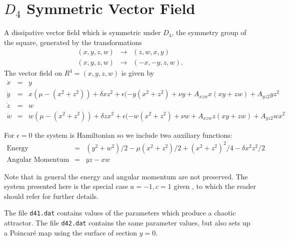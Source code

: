 \section{$D_4$ Symmetric Vector Field}

A dissipative vector field which is symmetric
under $D_4$, the symmetry group of the square, generated by
the transformations
\begin{eqnarray*}
	(x,y,z,w) &\to& (z,w,x,y) \\
	(x,y,z,w) &\to& (-x,-y,z,w).
\end{eqnarray*}
        The vector field on $R^4 = {(x,y,z,w)}$ is given by
\begin{eqnarray*}
                \dot{x} &=& y \\
                \dot{y} &=& x(\mu-(x^2 + z^2)) + \delta x z^2
                       + \epsilon( -y (x^2 + z^2) + \nu y
                       + A_{xzw} x(x y + z w) + A_{yz2} y z^2 \\
                \dot{z} &=& w \\
                \dot{w} &=& w(\mu-(x^2 + z^2)) + \delta z x^2
                       + \epsilon(-w (x^2 + z^2) + \nu w
                       + A_{xzw} z (x y + z w) + A_{yz2} w x^2
\end{eqnarray*}

For $\epsilon=0$ the system is Hamiltonian so we include two auxiliary
functions:
\begin{eqnarray*}
        \mbox{Energy} &=& (y^2 + w^2)/2 -  \mu(x^2+z^2)/2 + 
                    (x^2 + z^2)^2/4 - \delta x^2 z^2/2 \\
        \mbox{Angular~Momentum} &=& yz - xw
\end{eqnarray*}

        Note that in general the energy and angular momentum are not
preserved. The system presented here is the special case $a= -1, c=1$
given \cite{AGK}, to which the reader should refer for further details.

The file {\tt d41.dat} contains values of the parameters which produce a
chaotic attractor.  The file {\tt d42.dat} contains the same parameter
values, but also sets up a Poincar\'e map using the surface of section
$y=0$.
